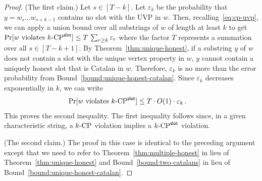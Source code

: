   \begin{proof}
    \newcommand{\EpsCat}{\mathsf{\varepsilon}}
    (The first claim.) 
    Let $s \in [T - k]$.
    Let $\EpsCat_{k}$ be 
    the probability that $y = w_s \ldots w_{s+k-1}$ contains no slot with the UVP in $w$. 
    Then, recalling~\eqref{eq:cp-uvp}, we can apply a union bound 
    over all substrings of $w$ of length at least $k$ to get 
    $
      \Pr[\text{$w$ violates $\kSlotCP$}] 
        \leq T\, \sum_{r \geq  k} \EpsCat_{r}
    $
    where the factor $T$ represents a summation over all $s \in [T - k + 1]$. 
    By Theorem~\ref{thm:unique-honest}, 
    if a substring $y$ of $w$ does not contain a slot with the unique vertex property in $w$, 
    $y$ cannot contain a uniquely honest slot that is Catalan in $w$.
    Therefore, $\EpsCat_k$ is no more than the error probability from Bound~\ref{bound:unique-honest-catalan}. 
    Since $\EpsCat_k$ decreases exponentially in $k$, 
    we can write 
    \begin{align*}
      \Pr[\text{$w$ violates $\kSlotCP$}] 
        &\leq T\cdot O(1) \cdot \EpsCat_{k}
        \,.
    \end{align*}
    This proves the second inequality. 
    The first inequality follows since, 
    in a given characteristic string, 
    a ${k}\text{-}\mathrm{CP}$ violation implies a ${k}\text{-}\mathrm{CP}^{\mathsf{slot}}$ violation.

    (The second claim.) 
    The proof in this case 
    is identical to the preceding argument except that 
    we need to refer to Theorem~\ref{thm:multiple-honest} in lieu of Theorem~\ref{thm:unique-honest}
    and Bound~\ref{bound:two-catalans} in lieu of Bound~\ref{bound:unique-honest-catalan}.
  \end{proof}
